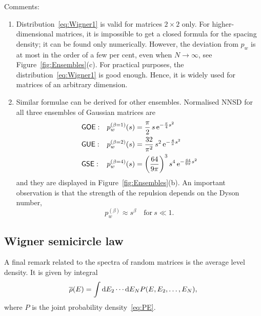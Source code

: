 \documentclass[a4paper,11pt,twoside]{article}
\begin{document}
            Comments:
            \begin{enumerate}
                \item Distribution~\eqref{eq:Wigner1} is valid for matrices $2\times2$ only.
                    For higher-dimensional matrices, it is impossible to get a closed formula for the spacing density; it can be found only numerically.
                    However, the deviation from $p_{w}$ is at most in the order of a few per cent, even when $N\rightarrow\infty$, see Figure~\ref{fig:Ensembles}(c).
                    For practical purposes, the distribution~\eqref{eq:Wigner1} is good enough. Hence, it is widely used for matrices of an arbitrary dimension.

                \item Similar formulae can be derived for other ensembles.
                    Normalised NNSD for all three ensembles of Gaussian matrices are
                    \begin{align}
                        &\mathsf{GOE}:
                        &p_{w}^{(\beta=1)}(s)
                            &=\frac{\pi}{2}\,s\operatorname{e}^{-\frac{\pi}{4}s^{2}}\nonumber\\
                        \label{eq:WignerAll}
                        &\mathsf{GUE}:
                        &p_{w}^{(\beta=2)}(s)
                            &=\frac{32}{\pi^{2}}\,s^{2}\operatorname{e}^{-\frac{4}{\pi}s^{2}}\\
                        &\mathsf{GSE}:
                        &p_{w}^{(\beta=4)}(s)
                            &=\left(\frac{64}{9\pi}\right)^{3}s^{4}\operatorname{e}^{-\frac{64}{9\pi}s^{2}}\nonumber
                    \end{align}
                    and they are displayed in Figure~\ref{fig:Ensembles}(b).
                    An important observation is that the strength of the repulsion depends on the Dyson number,
                    \begin{equation}
                        p_{w}^{(\beta)}\approx s^{\beta}\quad\text{for}\ s\ll1.
                    \end{equation} 
            \end{enumerate}

    \subsection{Wigner semicircle law}
        A final remark related to the spectra of random matrices is the average level density.
        It is given by integral
        \begin{equation}
            \overline{\rho}(E)=\int\mathrm{d} E_{2}\dotsb\mathrm{d} E_{N}P(E,E_{2},\dotsc,E_{N}),
        \end{equation}
        where $P$ is the joint probability density~\eqref{eq:PE}.
        
\end{document}
